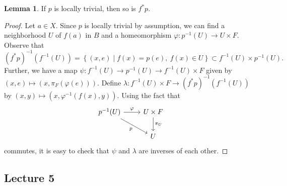 \documentclass[10pt,letterpaper,cm]{nupset}
\theoremstyle{definition}
\theoremstyle{theorem}
\newtheorem{lemma}[defn]{Lemma}
\theoremstyle{remark}
\newcommand{\1}{\mathbb{1}}
\newcommand{\0}{\vec 0}
\begin{document}
\begin{lemma}\label{pbtriv}
If $p$ is locally trivial, then so is $f^{\ast}{p}$. 
\end{lemma}
\begin{proof}
Let $a \in X$. Since $p$ is locally trivial by assumption, we can find a neighborhood $U$ of $f(a)$ in $B$ and a homeomorphism $\varphi : p^{-1}(U) \to U \times F$. Observe that 
\[
(f^{\ast}{p})^{-1}(f^{-1}(U)) = \left\{(x,e) \mid f(x) = p(e), \ f(x) \in U\right\} \subset f^{-1}(U) \times p^{-1}(U).
\] Further, we have a map $\psi : f^{-1}(U) \to p^{-1}(U) \to f^{-1}(U) \times F$ given by $\left(x,e\right) \mapsto \left(x, \pi_F(\varphi(e))\right)$. Define $\lambda : f^{-1}(U) \times F \to (f^{\ast}{p})^{-1}(f^{-1}(U))$ by $\left(x,y\right) \mapsto \left(x, \varphi^{-1}(f(x), y)\right)$. Using the fact that 
\[
\begin{tikzcd}
p^{-1}(U) \arrow[r, "\varphi"] \arrow[rd, "p"'] & U\times F \arrow[d, "\pi_U"] \\
                                                    & U                           
\end{tikzcd}
\] commutes, it is easy to check that $\psi$ and $\lambda$ are inverses of each other. 
\end{proof}



\subsection{Lecture 5}
\end{document}
